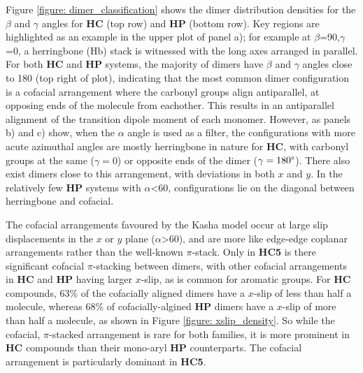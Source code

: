 Figure \ref{figure: dimer_classification} shows the dimer distribution densities for the $\beta$ and $\gamma$ angles for \textbf{HC} (top row) and \textbf{HP} (bottom row). Key regions are highlighted as an example in the upper plot of panel a); for example at $\beta$=90,$\gamma$=0, a herringbone (Hb) stack is witnessed with the long axes arranged in parallel. For both \textbf{HC} and \textbf{HP} systems, the majority of dimers have $\beta$ and $\gamma$ angles close to 180\degree{} (top right of plot), indicating that the most common dimer configuration is a cofacial arrangement where the carbonyl groups align antiparallel, at opposing ends of the molecule from eachother. This results in an antiparallel alignment of the \sone{} transition dipole moment of each monomer.  However, as panels b) and c) show, when the $\alpha$ angle is used as a filter, the configurations with more acute azimuthal angles are mostly herringbone in nature for \textbf{HC}, with carbonyl groups at the same ($\gamma=$0\degree) or opposite ends of the dimer ($\gamma=180\degree$). There also exist dimers close to this arrangement, with deviations in both $x$ and $y$. In the relatively few \textbf{HP} systems with  $\alpha$\textless{60}\degree{}, configurations lie on the diagonal between herringbone and cofacial.

The cofacial arrangements favoured by the Kasha model occur at large slip displacements in the $x$ or $y$  plane ($\alpha$\textgreater{60}), and are more like edge-edge coplanar arrangements rather than the well-known $\pi$-stack. Only in \textbf{HC5} is there significant cofacial $\pi$-stacking between dimers, with other cofacial arrangements in \textbf{HC} and \textbf{HP} having larger $x$-slip, as is common for aromatic groups. For \textbf{HC} compounds, 63\% of the cofacially aligned dimers have a $x$-slip of less than half a molecule, whereas 68\% of cofacially-algined \textbf{HP} dimers have a $x$-slip of more than half a molecule, as shown in Figure \ref{figure: xslip_density}. So while the cofacial, $\pi$-stacked arrangement is rare for both families, it is more prominent in \textbf{HC} compounds than their mono-aryl \textbf{HP} counterparts. The cofacial arrangement is particularly dominant in \textbf{HC5}.


